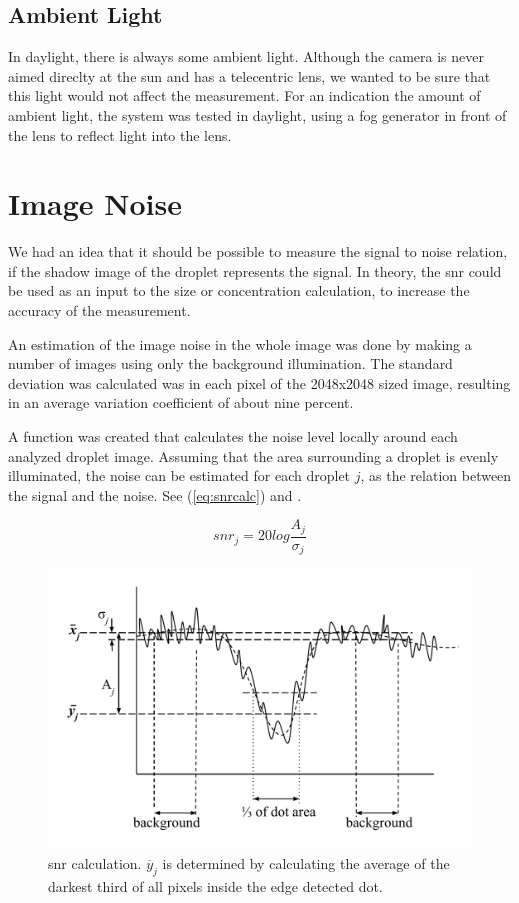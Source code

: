\subsection{Ambient Light}

In daylight, there is always some ambient light. Although the camera is never aimed direclty at the sun and has a telecentric lens, we wanted to be sure that this light would not affect the measurement. For an indication the amount of ambient light, the system was tested in daylight, using a fog generator in front of the lens to reflect light into the lens. 

\section{Image Noise}

We had an idea that it should be possible to measure the signal to noise relation, if the shadow image of the droplet represents the signal. In theory, the \gls{snr} could be used as an input to the size or concentration calculation, to increase the accuracy of the measurement. 

An estimation of the image noise in the whole image was done by making a number of images using only the background illumination. The standard deviation was calculated was in each pixel of the 2048x2048 sized image, resulting in an average variation coefficient of about nine percent.

A function was created that calculates the noise level locally around each analyzed droplet image. Assuming that the area surrounding a droplet is evenly illuminated, the noise can be estimated for each droplet $j$, as the relation between the signal and the noise. See (\ref{eq:snrcalc}) and .

\begin{equation}
snr_j = 20 log \frac{A_j}{\sigma_j}
\label{eq:snrcalc}
\end{equation}

\begin{figure}%
\centering\includegraphics[width=0.6\linewidth]{figures/snrcalc}
\caption{\gls{snr} calculation. $\overline{y}_j$ is determined by calculating the average of the darkest third of all pixels inside the edge detected dot.}
\label{fig:snrcalc}
\end{figure}

